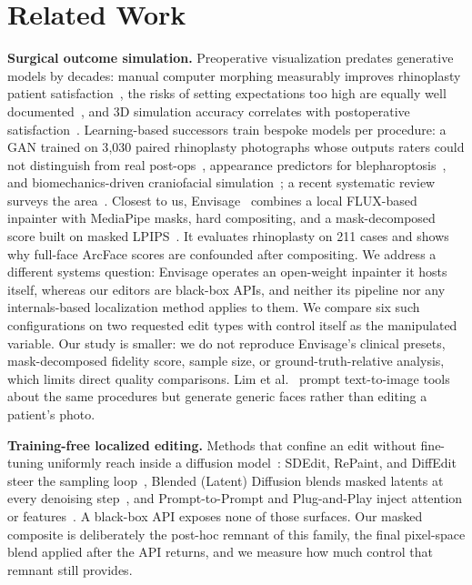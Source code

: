 \section{Related Work}
\label{sec:related}

\textbf{Surgical outcome simulation.} Preoperative visualization predates
generative models by decades: manual computer morphing measurably improves
rhinoplasty patient satisfaction~\cite{sharp2002computerimaging}, the risks of
setting expectations too high are equally well
documented~\cite{agarwal2007morph},
and 3D simulation accuracy correlates with postoperative
satisfaction~\cite{yamamichi2025crisalix,threedvr2026aesthetic}. Learning-based
successors train bespoke models per procedure: a GAN trained on 3{,}030 paired
rhinoplasty photographs whose outputs raters could not distinguish from real
post-ops~\cite{knoedler2024rhinoplastygan}, appearance predictors for
blepharoptosis~\cite{blepharoptosis2022poap,huang2024ptosisdiffusion}, and
biomechanics-driven craniofacial simulation~\cite{fang2022acmtnet}; a recent
systematic review surveys the area~\cite{stephanian2024fpsamreview}. Closest to us,
Envisage~\cite{agarwal2026envisage} combines a local FLUX-based inpainter with
MediaPipe masks, hard compositing, and a mask-decomposed score built on masked
LPIPS~\cite{zhang2018lpips}. It evaluates rhinoplasty on 211 cases and shows why
full-face ArcFace scores are confounded after compositing. We address a
different systems question: Envisage operates an open-weight inpainter it
hosts itself, whereas our editors are black-box APIs, and neither its
pipeline nor any internals-based localization method applies to them. We compare
six such configurations on two requested edit types with control itself as the
manipulated variable. Our study is smaller: we do not reproduce Envisage's
clinical presets, mask-decomposed fidelity score, sample size, or
ground-truth-relative analysis, which limits direct quality comparisons. Lim et
al.~\cite{lim2023generativecosmetic} prompt text-to-image tools about the same
procedures but generate generic faces rather than editing a patient's photo.

\textbf{Training-free localized editing.} Methods that confine an edit without
fine-tuning uniformly reach inside a diffusion model~\cite{rombach2022ldm}:
SDEdit, RePaint, and DiffEdit steer the sampling
loop~\cite{meng2022sdedit,lugmayr2022repaint,couairon2023diffedit},
Blended (Latent) Diffusion blends masked latents at every denoising
step~\cite{avrahami2022blended,avrahami2023blendedlatent}, and Prompt-to-Prompt
and Plug-and-Play inject attention or
features~\cite{hertz2023prompt2prompt,tumanyan2023plugandplay}. A black-box API
exposes none of those surfaces. Our masked composite is deliberately the
post-hoc remnant of this family, the final pixel-space blend applied after the
API returns, and we measure how much control that remnant still provides.

